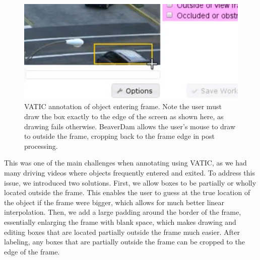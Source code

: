 \begin{figure}[h]
\includegraphics[width=14cm]{figs/vatic_border.png}
\centering
\caption{VATIC annotation of object entering frame. Note the user must draw the box exactly to the edge of the screen as shown here, as drawing fails otherwise. BeaverDam allows the user's mouse to draw to outside the frame, cropping back to the frame edge in post processing.}
\end{figure}

This was one of the main challenges when annotating using VATIC, as we had many driving videos where objects frequently entered and exited.
To address this issue, we introduced two solutions.
First, we allow boxes to be partially or wholly located outside the frame.
This enables the user to guess at the true location of the object if the frame were bigger, which allows for much better linear interpolation. %
Then, we add a large padding around the border of the frame, essentially enlarging the frame with blank space, which makes drawing and editing boxes that are located partially outside the frame much easier.
After labeling, any boxes that are partially outside the frame can be cropped to the edge of the frame.










